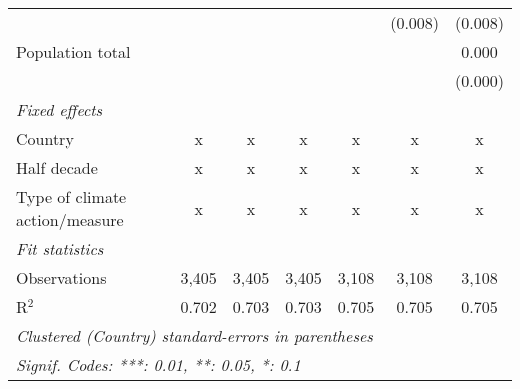 \begin{tabular}{lcccccc}
                                                    &         &               &               &               & (0.008)       & (0.008)\\   
   Population total                                 &         &               &               &               &               & 0.000\\   
                                                    &         &               &               &               &               & (0.000)\\   
   \emph{Fixed effects}\\
   Country                                          & x       & x             & x             & x             & x             & x\\  
   Half decade                                      & x       & x             & x             & x             & x             & x\\  
   Type of climate action/measure                   & x       & x             & x             & x             & x             & x\\  
   \midrule \emph{Fit statistics}\\
   Observations                                     & 3,405   & 3,405         & 3,405         & 3,108         & 3,108         & 3,108\\  
   R$^2$                                            & 0.702   & 0.703         & 0.703         & 0.705         & 0.705         & 0.705\\  
   \midrule
   \multicolumn{7}{l}{\emph{Clustered (Country) standard-errors in parentheses}}\\
   \multicolumn{7}{l}{\emph{Signif. Codes: ***: 0.01, **: 0.05, *: 0.1}}\\
\end{tabular}
\par\endgroup


